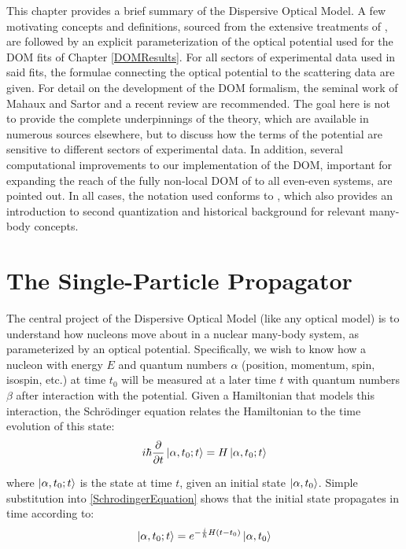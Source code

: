 This chapter provides a brief summary of the Dispersive Optical Model.
A few motivating concepts and definitions, sourced from the extensive treatments of \cite{MahzoonPhDThesis, MBTE},
are followed by an explicit parameterization of the optical potential used for the DOM fits of Chapter \ref{DOMResults}.
For all sectors of experimental data used in said fits, the formulae connecting the optical potential
to the scattering data are given. For detail on the development of the DOM formalism, the seminal
work of Mahaux and Sartor \cite{Mahaux1991} and a recent review \cite{Dickhoff2018} are recommended.
The goal here is not to provide the complete underpinnings of the theory, which are available in
numerous sources elsewhere, but to discuss how the terms of the potential are sensitive
to different sectors of experimental data.
In addition, several computational improvements to our implementation of the DOM, important for
expanding the reach of the fully non-local DOM of \cite{MahzoonPhDThesis} to all even-even systems,
are pointed out. In all cases, the notation used conforms to \cite{MBTE}, which also provides an
introduction to second quantization and historical background for relevant many-body concepts.

\section{The Single-Particle Propagator}
The central project of the Dispersive Optical Model (like any optical model) is
to understand how nucleons move about in a nuclear many-body system, as parameterized by an optical
potential.
Specifically, we wish to know
how a nucleon with energy $E$ and quantum numbers $\alpha$
(position, momentum, spin, isospin, etc.) at time $t_{0}$ will be measured at a
later time $t$ with quantum numbers $\beta$ after interaction with the
potential. Given a
Hamiltonian that models this interaction, the Schr\"odinger equation
relates the Hamiltonian to the time evolution of this state:
\begin{equation} \label{SchrodingerEquation}
    i\hbar\frac{\partial}{\partial t}\ket{\alpha, t_{0}; t} = H\ket{\alpha, t_{0}; t}
\end{equation}

\noindent
where $\ket{\alpha, t_{0}; t}$ is the state at time $t$, given an initial state
$\ket{\alpha, t_{0}}$. Simple substitution into \ref{SchrodingerEquation} shows
that the initial state propagates in time according to:
\begin{equation}
    \ket{\alpha, t_{0}; t} = e^{-\frac{i}{\hbar}H(t-t_{0})}\ket{\alpha, t_{0}}
\end{equation}

